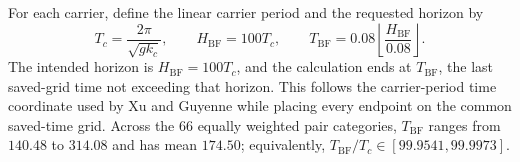 For each carrier, define the linear carrier period and the requested horizon
by
\begin{equation}
  T_c=\frac{2\pi}{\sqrt{gk_c}},\qquad
  H_{\mathrm{BF}}=100T_c,
  \qquad
  T_{\mathrm{BF}}
  =0.08\left\lfloor\frac{H_{\mathrm{BF}}}{0.08}\right\rfloor.
  \label{eq:paper-bf-horizon}
\end{equation}
The intended horizon is $H_{\mathrm{BF}}=100T_c$, and the calculation ends
at $T_{\mathrm{BF}}$, the last saved-grid time not exceeding that horizon.
This follows the carrier-period time coordinate used by Xu and Guyenne while
placing every endpoint on the common saved-time grid.  Across the 66 equally
weighted pair categories, $T_{\mathrm{BF}}$ ranges from $140.48$ to $314.08$
and has mean $174.50$; equivalently,
$T_{\mathrm{BF}}/T_c\in[99.9541,99.9973]$.

